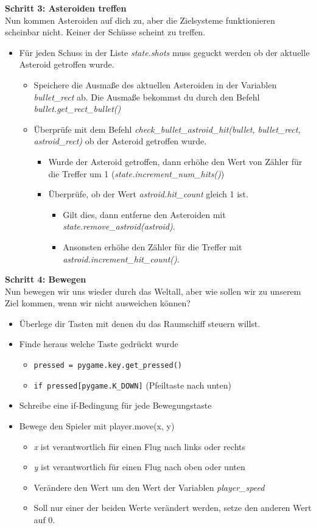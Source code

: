 \textbf{Schritt 3: Asteroiden treffen}\\
Nun kommen Asteroiden auf dich zu, aber die Zielsysteme funktionieren scheinbar nicht. Keiner der Schüsse scheint zu treffen.
\begin{itemize}
	\item Für jeden Schuss in der Liste \textit{state.shots} muss geguckt werden ob der aktuelle Asteroid getroffen wurde.
	\begin{itemize}
		\item Speichere die Ausmaße des aktuellen Asteroiden in der Variablen \textit{bullet\_rect} ab. Die Ausmaße bekommst du durch den Befehl \textit{bullet.get\_rect\_bullet()}
		\item Überprüfe mit dem Befehl \textit{check\_bullet\_astroid\_hit(bullet, bullet\_rect, astroid\_rect)} ob der Asteroid getroffen wurde.
		\begin{itemize}
			\item Wurde der Asteroid getroffen, dann erhöhe den Wert von Zähler für die Treffer um 1 (\textit{state.increment\_num\_hits()})
			\item Überprüfe, ob der Wert \textit{astroid.hit\_count} gleich 1 ist.
			\begin{itemize}
				\item Gilt dies, dann entferne den Asteroiden mit \textit{state.remove\_astroid(astroid)}.
				\item Ansonsten erhöhe den Zähler für die Treffer mit \textit{astroid.increment\_hit\_count()}.
			\end{itemize}
		\end{itemize}
	\end{itemize}
\end{itemize}
\textbf{Schritt 4: Bewegen}\\
Nun bewegen wir uns wieder durch das Weltall, aber wie sollen wir zu unserem Ziel kommen, wenn wir nicht ausweichen können?
\begin{itemize}
	\item Überlege dir Tasten mit denen du das Raumschiff steuern willst.
	\item Finde heraus welche Taste gedrückt wurde
	\begin{itemize}
		\item \texttt{pressed = pygame.key.get\_pressed()}
		\item \texttt{if pressed[pygame.K\_DOWN]} (Pfeiltaste nach unten)
	\end{itemize}
	\item Schreibe eine if-Bedingung für jede Bewegungstaste
	\item Bewege den Spieler mit player.move(x, y)
	\begin{itemize}
		\item \textit{x} ist verantwortlich für einen Flug nach links oder rechts
		\item \textit{y} ist verantwortlich für einen Flug nach oben oder unten
		\item Verändere den Wert um den Wert der Variablen \textit{player\_speed}
		\item Soll nur einer der beiden Werte verändert werden, setze den anderen Wert auf 0.
	\end{itemize}	 
\end{itemize}